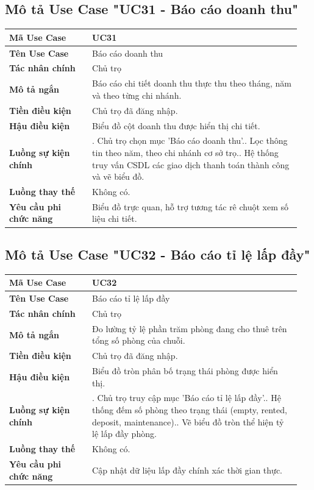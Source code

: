 \subsection{Mô tả Use Case "UC31 - Báo cáo doanh thu"}

\begin{longtable}[]{@{}>{\RaggedRight\arraybackslash}p{0.27\linewidth}>{\RaggedRight\arraybackslash}p{0.68\linewidth}@{}}
\toprule
\textbf{Mã Use Case} & UC31\tabularnewline
\midrule
\endhead
\textbf{Tên Use Case} & Báo cáo doanh thu\tabularnewline
\textbf{Tác nhân chính} & Chủ trọ\tabularnewline
\textbf{Mô tả ngắn} & Báo cáo chi tiết doanh thu thực thu theo tháng,
năm và theo từng chi nhánh.\tabularnewline
\textbf{Tiền điều kiện} & Chủ trọ đã đăng nhập.\tabularnewline
\textbf{Hậu điều kiện} & Biểu đồ cột doanh thu được hiển thị chi
tiết.\tabularnewline
\textbf{Luồng sự kiện chính} & 1. Chủ trọ chọn mục
'Báo cáo doanh thu'.\newline 2. Lọc thông tin theo năm, theo chi
nhánh cơ sở trọ.\newline 3. Hệ thống truy vấn CSDL các giao dịch
thanh toán thành công và vẽ biểu đồ.\tabularnewline
\textbf{Luồng thay thế} & Không có.\tabularnewline
\textbf{Yêu cầu phi chức năng} & Biểu đồ trực quan, hỗ trợ tương tác rê
chuột xem số liệu chi tiết.\tabularnewline
\bottomrule
\end{longtable}

\subsection{Mô tả Use Case "UC32 - Báo cáo tỉ lệ lấp đầy"}

\begin{longtable}[]{@{}>{\RaggedRight\arraybackslash}p{0.27\linewidth}>{\RaggedRight\arraybackslash}p{0.68\linewidth}@{}}
\toprule
\textbf{Mã Use Case} & UC32\tabularnewline
\midrule
\endhead
\textbf{Tên Use Case} & Báo cáo tỉ lệ lấp đầy\tabularnewline
\textbf{Tác nhân chính} & Chủ trọ\tabularnewline
\textbf{Mô tả ngắn} & Đo lường tỷ lệ phần trăm phòng đang cho thuê trên
tổng số phòng của chuỗi.\tabularnewline
\textbf{Tiền điều kiện} & Chủ trọ đã đăng nhập.\tabularnewline
\textbf{Hậu điều kiện} & Biểu đồ tròn phân bố trạng thái phòng được hiển
thị.\tabularnewline
\textbf{Luồng sự kiện chính} & 1. Chủ trọ truy cập
mục 'Báo cáo tỉ lệ lấp đầy'.\newline 2. Hệ thống đếm số phòng theo
trạng thái (empty, rented, deposit, maintenance).\newline 3. Vẽ
biểu đồ tròn thể hiện tỷ lệ lấp đầy phòng.\tabularnewline
\textbf{Luồng thay thế} & Không có.\tabularnewline
\textbf{Yêu cầu phi chức năng} & Cập nhật dữ liệu lấp đầy chính xác thời
gian thực.\tabularnewline
\bottomrule
\end{longtable}

